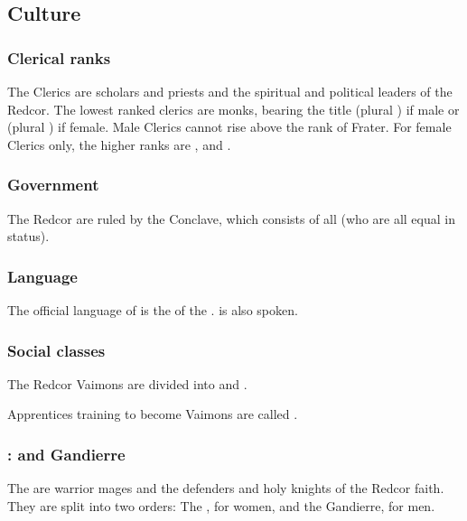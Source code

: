 \subsection{Culture}






\subsubsection{Clerical ranks}
The Clerics are scholars and priests and the spiritual and political leaders of the Redcor. 
The lowest ranked clerics are monks, bearing the title \emph{\frater} (plural \emph{\fratres}) if male or \emph{\soror} (plural \emph{\sorores}) if female. 
Male Clerics cannot rise above the rank of Frater. 
For female Clerics only, the higher ranks are \mater, \matron and \matriarch. 





\subsubsection{Government}
The Redcor are ruled by the Conclave, which consists of all \matriarchs{} (who are all equal in status). 





\subsubsection{Language}
The official language of \Redce is the  of the . 
 is also spoken. 





\subsubsection{Social classes}
The Redcor Vaimons are divided into \clerics{} and \templars{}. 

Apprentices training to become Vaimons are called \neophytes.\index{\neophyte}





\subsubsection{\Templars: \Ryzin{} and Gandierre}
The \templars{} are warrior mages and the defenders and holy knights of the Redcor faith. 
They are split into two orders: 
The {\Ryzin}, for women, and the {Gandierre}, for men. 

